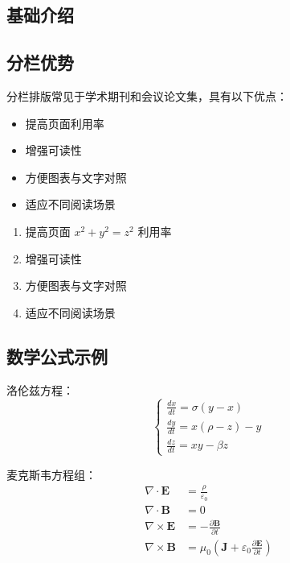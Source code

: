 \documentclass[14pt,a4paper,UTF8,twoside]{article}
\begin{document}
\begin{multicols}{2} %
    \section{基础介绍}
    \subsection{分栏优势}
    分栏排版常见于学术期刊和会议论文集，具有以下优点：

    \begin{itemize}
        \item 提高页面利用率
        \item 增强可读性
        \item 方便图表与文字对照
        \item 适应不同阅读场景
    \end{itemize}

    \begin{enumerate}
        \item 提高页面 $ x^2 + y^2 = z^2 $ 利用率
        \item 增强可读性
        \item 方便图表与文字对照
        \item 适应不同阅读场景
    \end{enumerate}

    \subsection{数学公式示例}
    洛伦兹方程：
    \begin{equation}
        \begin{cases}
            \frac{dx}{dt} = \sigma(y - x)   \\
            \frac{dy}{dt} = x(\rho - z) - y \\
            \frac{dz}{dt} = xy - \beta z
        \end{cases}
    \end{equation}

    麦克斯韦方程组：
    $$
        \begin{aligned}
            \nabla \cdot \mathbf{E}  & = \frac{\rho}{\varepsilon_0}                                                          \\
            \nabla \cdot \mathbf{B}  & = 0                                                                                   \\
            \nabla \times \mathbf{E} & = -\frac{\partial \mathbf{B}}{\partial t}                                             \\
            \nabla \times \mathbf{B} & = \mu_0\left(\mathbf{J} + \varepsilon_0 \frac{\partial \mathbf{E}}{\partial t}\right)
        \end{aligned}
    $$


\end{multicols}
\end{document}

